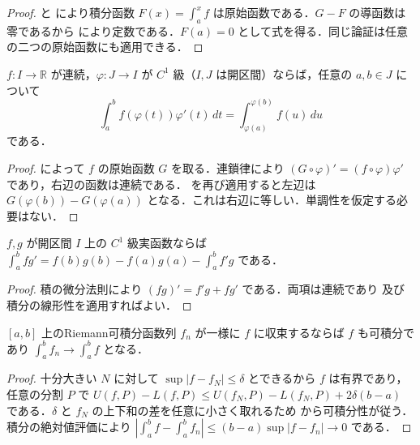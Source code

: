 \begin{proof}
 と  により積分函数 $F(x)=\int_a^x f$ は原始函数である．$G-F$ の導函数は零であるから  により定数である．$F(a)=0$ として式を得る．同じ論証は任意の二つの原始函数にも適用できる．
\end{proof}
\begin{prop}[置換積分]
$f:I\to\mathbb R$ が連続，$\varphi:J\to I$ が $C^1$ 級（$I,J$ は開区間）ならば，任意の $a,b\in J$ について
\[
\int_a^b f(\varphi(t))\varphi'(t)\,dt=\int_{\varphi(a)}^{\varphi(b)}f(u)\,du
\]
である．
\end{prop}
\begin{proof}
 によって $f$ の原始函数 $G$ を取る．連鎖律により $(G\circ\varphi)'=(f\circ\varphi)\varphi'$ であり，右辺の函数は連続である． を再び適用すると左辺は $G(\varphi(b))-G(\varphi(a))$ となる．これは右辺に等しい．単調性を仮定する必要はない．
\end{proof}
\begin{prop}[部分積分]
$f,g$ が開区間 $I$ 上の $C^1$ 級実函数ならば $\int_a^b fg'=f(b)g(b)-f(a)g(a)-\int_a^b f'g$ である．
\end{prop}
\begin{proof}
積の微分法則により $(fg)'=f'g+fg'$ である．両項は連続であり  及び積分の線形性を適用すればよい．
\end{proof}
\begin{prop}[一様収束とRiemann積分]
$[a,b]$ 上のRiemann可積分函数列 $f_n$ が一様に $f$ に収束するならば $f$ も可積分であり $\int_a^b f_n\to\int_a^b f$ となる．
\end{prop}
\begin{proof}
十分大きい $N$ に対して $\sup|f-f_N|\leq\delta$ とできるから $f$ は有界であり，任意の分割 $P$ で $U(f,P)-L(f,P)\leq U(f_N,P)-L(f_N,P)+2\delta(b-a)$ である．$\delta$ と $f_N$ の上下和の差を任意に小さく取れるため  から可積分性が従う．積分の絶対値評価により $|\int_a^b f-\int_a^b f_n|\leq(b-a)\sup|f-f_n|\to0$ である．
\end{proof}

